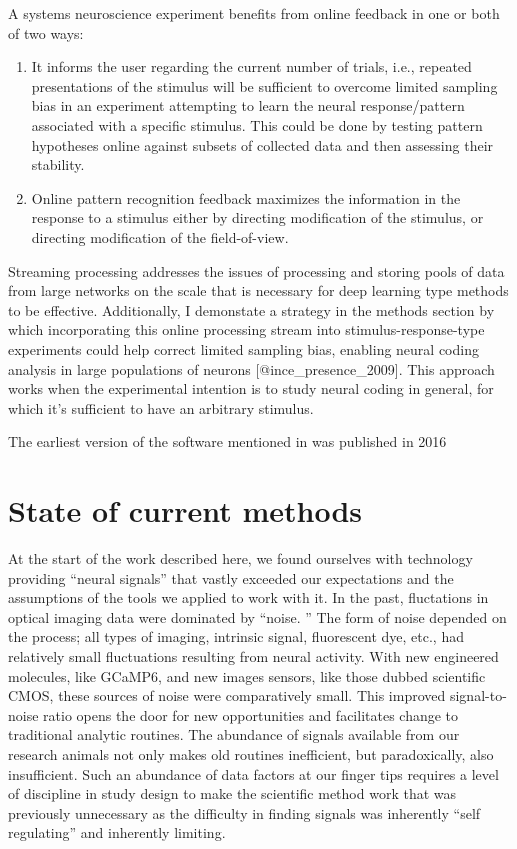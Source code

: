 \documentclass[../main.tex]{subfiles}
\begin{document}
A systems neuroscience experiment benefits from online feedback in one or both of two ways:

\begin{enumerate}
	\def\labelenumi{\arabic{enumi}.
	}
	\item
	      It informs the user regarding the current number of trials, i.e.,
	      repeated presentations of the stimulus will be sufficient to overcome
	      limited sampling bias in an experiment attempting to learn the neural
	      response/pattern associated with a specific stimulus.
	      This could be done by testing pattern hypotheses online against subsets of collected data and then assessing their stability.
	\item
	      Online pattern recognition feedback maximizes the information in the
	      response to a stimulus either by directing modification of the
	      stimulus, or directing modification of the field-of-view.
\end{enumerate}

Streaming processing addresses the issues of processing and storing pools of data from large networks on the scale that is necessary for deep learning type methods to be effective.
Additionally, I demonstate a strategy in the methods section by which incorporating this online processing stream into stimulus-response-type experiments could help correct limited sampling bias, enabling neural coding analysis in large populations of neurons {[}@ince\_presence\_2009{]}.
This approach works when the experimental intention is to study neural coding in general, for which it's sufficient to have an arbitrary stimulus.




The earliest version of the software mentioned in  was published in 2016 \cite{mohammed2016integrative}

\section{State of current methods}\label{sec:state-of-current-methods}

At the start of the work described here, we found ourselves with technology providing “neural signals” that vastly exceeded our expectations and the assumptions of the tools we applied to work with it.
In the past, fluctations in optical imaging data were dominated by “noise.
” The form of noise depended on the process; all types of imaging, intrinsic signal, fluorescent dye, etc., had relatively small fluctuations resulting from neural activity.
With new engineered molecules, like GCaMP6, and new images sensors, like those dubbed scientific CMOS, these sources of noise were comparatively small.
This improved signal-to-noise ratio opens the door for new opportunities and facilitates change to traditional analytic routines.
The abundance of signals available from our research animals not only makes old routines inefficient, but paradoxically, also insufficient.
Such an abundance of data factors at our finger tips requires a level of discipline in study design to make the scientific method work that was previously unnecessary as the difficulty in finding signals was inherently “self regulating” and inherently limiting.
\end{document}
